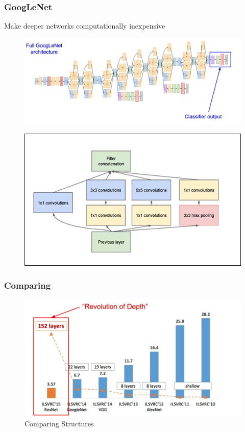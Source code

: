 \documentclass{beamer}
\begin{document}
\begin{frame}[fragile]
\frametitle{GoogLeNet}
{\color{red} Make deeper networks computationally inexpensive}
\begin{figure}
	\includegraphics[height=0.3\textheight]{Pics/googlenet.png}
\end{figure}
\begin{figure}
	\includegraphics[height=0.4\textheight]{Pics/inception.jpg}
\end{figure}
\end{frame}

\begin{frame}
\frametitle{Comparing}

\begin{figure}
	\includegraphics[width=\linewidth]{Pics/com3.png}
	\caption{Comparing Structures}
\end{figure}

\end{frame}
\end{document}
